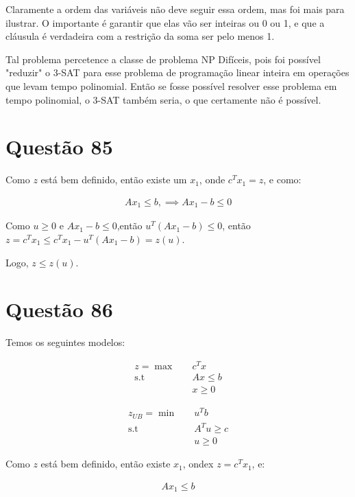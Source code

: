 \documentclass[]{article}
\numberwithin{equation}{section}
\begin{document}
Claramente a ordem das variáveis não deve seguir essa ordem, mas foi mais para ilustrar. O importante é garantir que elas vão ser inteiras ou 0 ou 1, e que a cláusula é verdadeira com a restrição da soma ser pelo menos 1.

Tal problema percetence a classe de problema NP Difíceis, pois foi possível "reduzir" o 3-SAT para esse problema de programação linear inteira em operações que levam tempo polinomial. Então se fosse possível resolver esse problema em tempo polinomial, o 3-SAT também seria, o que certamente não é possível.

\section{Questão 85}

Como $z$ está bem definido, então existe um $x_1$, onde $c^Tx_1 = z$, e como:

\begin{align}
     Ax_1 \leq b, \implies Ax_1 - b \leq 0
\end{align}

Como $u \geq 0$ e $Ax_1 - b \leq 0$,então $u^T(Ax_1 - b) \leq 0$, então
$z = c^Tx_1 \leq c^Tx_1 - u^T(Ax_1 - b) = z(u)$.

Logo, $z \leq z(u)$.

\section{Questão 86}

Temos os seguintes modelos:

\begin{align}
z =   \max        &\quad  c^Tx       \\
      \text{s.t}  &\quad  Ax \leq b  \\
                  &\quad  x \geq 0
\end{align}

\begin{align}
z_{UB} =  \min        &\quad  u^Tb        \label{startDLP} \\
          \text{s.t}  &\quad  A^Tu \geq c                  \\
                      &\quad  u \geq 0    \label{endDLP}
\end{align}

Como $z$ está bem definido, então existe $x_1$, ondex $z = c^Tx_1$, e:

\begin{align}
     Ax_1 \leq b
\end{align}
\end{document}
